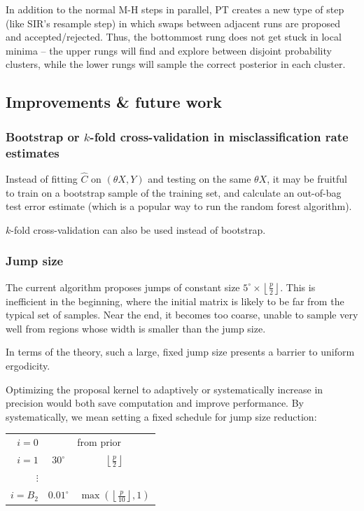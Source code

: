 \documentclass[ejs,preprint]{imsart}
\begin{document}
In addition to the normal M-H steps in parallel, PT creates a new type of step (like SIR's resample step) in which swaps between adjacent runs are proposed and accepted/rejected. Thus, the bottommost rung does not get stuck in local minima -- the upper rungs will find and explore between disjoint probability clusters, while the lower rungs will sample the correct posterior in each cluster.

\subsection{Improvements \& future work}

\subsubsection{Bootstrap or $k$-fold cross-validation in misclassification rate estimates}

Instead of fitting $\hat C$ on $(\theta X, Y)$ and testing on the same $\theta X$, it may be fruitful to train on a bootstrap sample of the training set, and calculate an out-of-bag test error estimate (which is a popular way to run the random forest algorithm).

$k$-fold cross-validation can also be used instead of bootstrap.

\subsubsection{Jump size}

The current algorithm proposes jumps of constant size $5^\circ\times\left\lfloor\frac{p}{2}\right\rfloor$. This is inefficient in the beginning, where the initial matrix is likely to be far from the typical set of samples. Near the end, it becomes too coarse, unable to sample very well from regions whose width is smaller than the jump size.

In terms of the theory, such a large, fixed jump size presents a barrier to uniform ergodicity.

Optimizing the proposal kernel to adaptively or systematically increase in precision would both save computation and improve performance. By systematically, we mean setting a fixed schedule for jump size reduction:

\begin{center}
\begin{tabular}{r|cc}
$i=0$ & \multicolumn{2}{c}{from prior} \\
$i=1$ & $30^\circ$ & $\left\lfloor\frac{p}{2}\right\rfloor$ \\
$\vdots$ & & \\
$i=B_2$ & $0.01^\circ$ & $\max\left(\left\lfloor\frac{p}{10}\right\rfloor, 1\right)$
\end{tabular}
\end{center}
\end{document}
